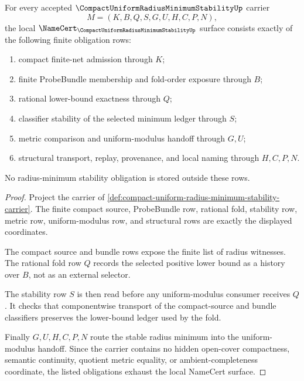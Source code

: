 \begin{theorem}
\label{thm:compact-uniform-radius-minimum-stability-namecert-obligations}
For every accepted $\CompactUniformRadiusMinimumStabilityUp$ carrier
$$
M=(K,B,Q,S,G,U,H,C,P,N),
$$
the local $\NameCert_{\CompactUniformRadiusMinimumStabilityUp}$ surface consists exactly of the following finite obligation rows:
\begin{enumerate}
\item compact finite-net admission through $K$;
\item finite ProbeBundle membership and fold-order exposure through $B$;
\item rational lower-bound exactness through $Q$;
\item classifier stability of the selected minimum ledger through $S$;
\item metric comparison and uniform-modulus handoff through $G,U$;
\item structural transport, replay, provenance, and local naming through $H,C,P,N$.
\end{enumerate}
No radius-minimum stability obligation is stored outside these rows.
\end{theorem}
\begin{proof}
Project the carrier of \autoref{def:compact-uniform-radius-minimum-stability-carrier}. The finite compact source, ProbeBundle row, rational fold, stability row, metric row, uniform-modulus row, and structural rows are exactly the displayed coordinates.

The compact source and bundle rows expose the finite list of radius witnesses. The rational fold row $Q$ records the selected positive lower bound as a history over $B$, not as an external selector.

The stability row $S$ is then read before any uniform-modulus consumer receives $Q$. It checks that componentwise transport of the compact-source and bundle classifiers preserves the lower-bound ledger used by the fold.

Finally $G,U,H,C,P,N$ route the stable radius minimum into the uniform-modulus handoff. Since the carrier contains no hidden open-cover compactness, semantic continuity, quotient metric equality, or ambient-completeness coordinate, the listed obligations exhaust the local NameCert surface.
\end{proof}

